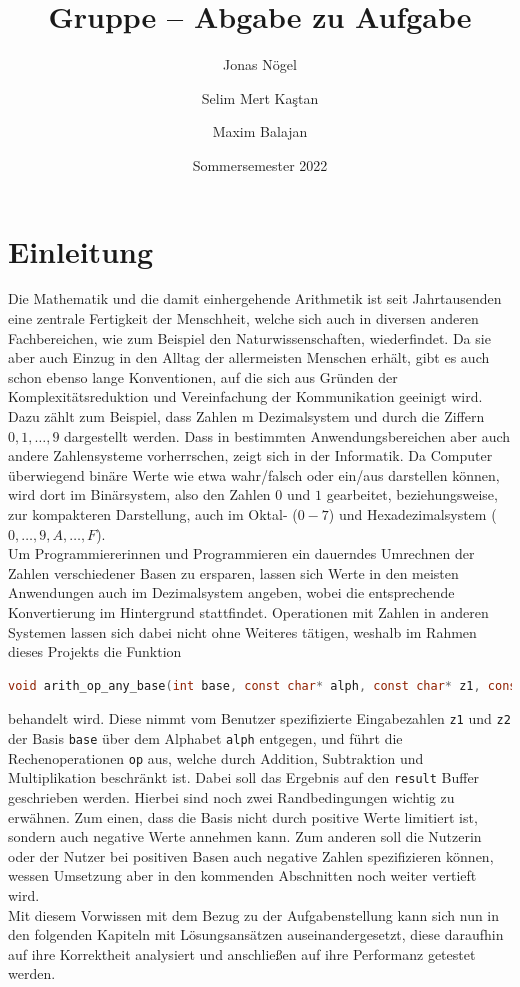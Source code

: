 \documentclass[course=erap]{aspdoc}
\author{Jonas Nögel \and Selim Mert Kaştan \and Maxim Balajan}
\date{Sommersemester 2022} %
\title{Gruppe \theGroup{} -- Abgabe zu Aufgabe \theNumber}
\begin{document}
    \maketitle


    \section{Einleitung}

    Die Mathematik und die damit einhergehende Arithmetik ist seit Jahrtausenden eine zentrale Fertigkeit der Menschheit, welche sich auch in
    diversen anderen Fachbereichen, wie zum Beispiel den Naturwissenschaften, wiederfindet. Da sie aber auch Einzug in den Alltag der
    allermeisten Menschen erhält, gibt es auch schon ebenso lange Konventionen, auf die sich aus Gründen der Komplexitätsreduktion und Vereinfachung
    der Kommunikation geeinigt wird. Dazu zählt zum Beispiel, dass Zahlen m Dezimalsystem und durch die Ziffern $0, 1, \dots, 9$ dargestellt werden.
    Dass in bestimmten Anwendungsbereichen aber auch andere Zahlensysteme vorherrschen, zeigt sich in der Informatik. Da Computer überwiegend
    binäre Werte wie etwa wahr/falsch oder ein/aus darstellen können, wird dort im Binärsystem, also den Zahlen $0$ und $1$ gearbeitet,
    beziehungsweise, zur kompakteren Darstellung, auch im Oktal- ($0 - 7$) und Hexadezimalsystem ($0, \dots, 9, A, \dots, F$).\\
    \newline
    Um Programmiererinnen und Programmieren ein dauerndes Umrechnen der Zahlen verschiedener Basen zu ersparen, lassen sich Werte in den
    meisten Anwendungen auch im Dezimalsystem angeben, wobei die entsprechende Konvertierung im Hintergrund stattfindet. Operationen mit
    Zahlen in anderen Systemen lassen sich dabei nicht ohne Weiteres tätigen, weshalb im Rahmen dieses Projekts die Funktion
    \newline
    \begin{lstlisting}[language=c, numbers=none, frame=none]
    void arith_op_any_base(int base, const char* alph, const char* z1, const char* z2, char op, char* result)
    \end{lstlisting}
    behandelt wird. Diese nimmt vom Benutzer spezifizierte Eingabezahlen \verb+z1+
    und \verb+z2+ der Basis \verb+base+ über dem Alphabet \verb+alph+ entgegen, und führt die Rechenoperationen \verb+op+ aus, welche durch
    Addition, Subtraktion und Multiplikation beschränkt ist. Dabei soll das Ergebnis auf den \verb+result+ Buffer geschrieben werden. Hierbei
    sind noch zwei Randbedingungen wichtig zu erwähnen. Zum einen, dass die Basis nicht durch positive Werte limitiert ist, sondern auch
    negative Werte annehmen kann. Zum anderen soll die Nutzerin oder der Nutzer bei positiven Basen auch negative Zahlen spezifizieren können,
    wessen Umsetzung aber in den kommenden Abschnitten noch weiter vertieft wird. \\
    \newline
    Mit diesem Vorwissen mit dem Bezug zu der Aufgabenstellung kann sich nun in den folgenden Kapiteln mit Lösungsansätzen auseinandergesetzt,
    diese daraufhin auf ihre Korrektheit analysiert und anschließen auf ihre Performanz getestet werden.
\end{document}
